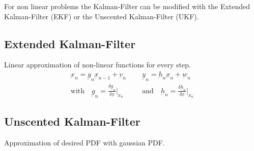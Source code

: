 \newpage
\begin{mdframed}[style=eqbox]
  For non linear problems the Kalman-Filter can be modified with the Extended Kalman-Filter (EKF) or the Unscented Kalman-Filter (UKF).

  \subsection{Extended Kalman-Filter}
  Linear approximation of non-linear functions for every step.
  \vspace*{-4pt}
  \begin{align*}
    \underbar{x}_n = \underbar{g}_n \underbar{x}_{n-1} + \underbar{v}_n && \underbar{y}_n = \underbar{h}_n \underbar{x}_n + \underbar{w}_n\\
    \text{with} \quad \underbar{g}_n = \frac{\delta \underbar{g}_n}{\delta \underbar{x}} \vert_{x_{n}} \quad &&\text{and} \quad \underbar{h}_n = \frac{\delta \underbar{h}_n}{\delta \underbar{x}} \vert_{x_{n}}
  \end{align*}

  \subsection{Unscented Kalman-Filter}
  Approximation of desired PDF with gaussian PDF.\\
\end{mdframed}